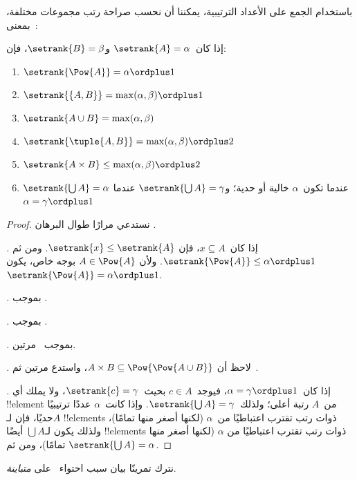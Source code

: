 \documentclass[../../../include/open-logic-section]{subfiles}
\begin{document}

باستخدام الجمع على الأعداد الترتيبية، يمكننا أن نحسب صراحة رتب
مجموعات مختلفة، بمعنى~:

\begin{lem}
إذا كان~$\setrank{A} = \alpha$ و$\setrank{B} = \beta$، فإن:
\begin{enumerate}
	\item{} $\setrank{\Pow{A}} = \alpha\ordplus 1$
	\item{} $\setrank{\{A, B\}} = \max(\alpha,
	\beta) \ordplus 1$
	\item{} $\setrank{A \cup B} = \max(\alpha,
	\beta)$
	\item{} $\setrank{\tuple{A,B}} = \max(\alpha,
	\beta) \ordplus 2$
	\item{} $\setrank{A \times B} \leq \max(\alpha,
	\beta) \ordplus 2$
	\item{} $\setrank{\bigcup A} = \alpha$ عندما
	تكون~$\alpha$ خالية أو حدية؛ و$\setrank{\bigcup A} = \gamma$ عندما
	$\alpha = \gamma\ordplus 1$
\end{enumerate}
\end{lem}

\begin{proof}
نستدعي مرارًا طوال البرهان
.

\emph{.} إذا كان~$x \subseteq A$، فإن
$\setrank{x} \leq \setrank{A}$. ومن ثم
$\setrank{\Pow{A}} \leq \alpha \ordplus 1$. ولأن
$A \in \Pow{A}$ بوجه خاص، يكون
$\setrank{\Pow{A}} = \alpha \ordplus 1$.

\emph{.} بموجب
.

\emph{.} بموجب
.

\emph{.} بموجب~ مرتين.

\emph{.} لاحظ أن
$A \times B \subseteq \Pow{\Pow{A \cup B}}$، واستدع
 مرتين ثم~.

\emph{.} إذا كان~$\alpha = \gamma\ordplus 1$،
فيوجد~$c \in A$ بحيث~$\setrank{c} = \gamma$، ولا يملك أي
!!{element} من~$A$ رتبة أعلى؛ ولذلك~$\setrank{\bigcup A} = \gamma$.
وإذا كانت~$\alpha$ عددًا ترتيبيًا حديًا، فإن لـ$A$ !!{element}s ذوات
رتب تقترب اعتباطيًا من~$\alpha$ (لكنها أصغر منها تمامًا)، ولذلك يكون
لـ$\bigcup A$ أيضًا !!{element}s ذوات رتب تقترب اعتباطيًا من
$\alpha$ (لكنها أصغر منها تمامًا)، ومن ثم
$\setrank{\bigcup A} = \alpha$.
\end{proof}
\noindent
نترك تمرينًا بيان سبب احتواء~ على \emph{متباينة}.
\end{document}
